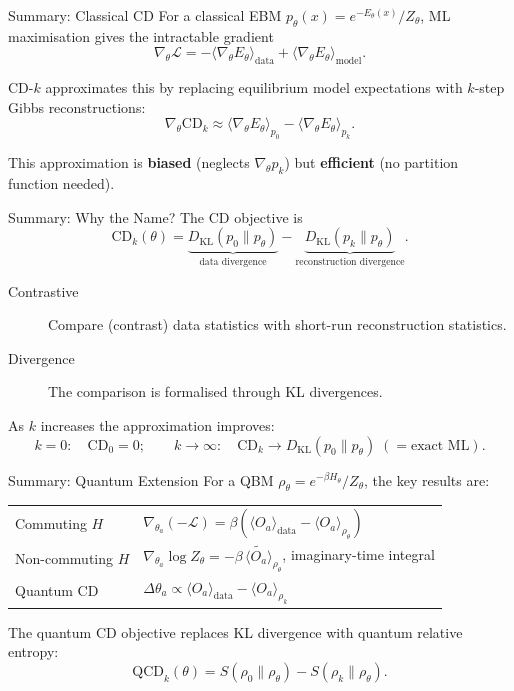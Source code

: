 \documentclass[aspectratio=169]{beamer}
\newcommand{\pmodel}{p_{\theta}}
\newcommand{\DKL}{D_{\mathrm{KL}}}
\newcommand{\Zth}{Z_\theta}
\begin{document}
\begin{frame}{Summary: Classical CD}
For a classical EBM $\pmodel(x) = e^{-E_\theta(x)}/\Zth$,
ML maximisation gives the intractable gradient
\[
  \nabla_\theta\mathcal{L}
  = -\langle\nabla_\theta E_\theta\rangle_{\mathrm{data}}
    + \langle\nabla_\theta E_\theta\rangle_{\mathrm{model}}.
\]

CD-$k$ approximates this by replacing equilibrium model expectations
with $k$-step Gibbs reconstructions:
\[
  \nabla_\theta\mathrm{CD}_k
  \approx
  \langle\nabla_\theta E_\theta\rangle_{p_0}
  -
  \langle\nabla_\theta E_\theta\rangle_{p_k}.
\]

This approximation is \textbf{biased} (neglects $\nabla_\theta p_k$) but
\textbf{efficient} (no partition function needed).
\end{frame}

\begin{frame}{Summary: Why the Name?}
The CD objective is
\[
  \mathrm{CD}_k(\theta)
  =
  \underbrace{\DKL(p_0\|\pmodel)}_{\text{data divergence}}
  -
  \underbrace{\DKL(p_k\|\pmodel)}_{\text{reconstruction divergence}}.
\]

\begin{description}
  \item[Contrastive] Compare (contrast) data statistics with short-run
        reconstruction statistics.
  \item[Divergence] The comparison is formalised through KL divergences.
\end{description}

As $k$ increases the approximation improves:
\[
  k=0: \quad \mathrm{CD}_0 = 0;
  \qquad
  k\to\infty: \quad \mathrm{CD}_k \to \DKL(p_0\|\pmodel) \;(= \text{exact ML}).
\]
\end{frame}

\begin{frame}{Summary: Quantum Extension}
For a QBM $\rho_\theta = e^{-\beta H_\theta}/\Zth$, the key results are:

\medskip
\begin{tabular}{ll}
  Commuting $H$ & $\nabla_{\theta_a}(-\mathcal{L})
                  = \beta(\langle O_a\rangle_{\mathrm{data}}
                         - \langle O_a\rangle_{\rho_\theta})$ \\[6pt]
  Non-commuting $H$ & $\nabla_{\theta_a}\log\Zth
                       = -\beta\,\widetilde{\langle O_a\rangle}_{\rho_\theta}$,
                       imaginary-time integral \\[6pt]
  Quantum CD & $\Delta\theta_a
               \propto \langle O_a\rangle_{\mathrm{data}}
                       - \langle O_a\rangle_{\rho_k}$
\end{tabular}

\medskip
The quantum CD objective replaces KL divergence with quantum relative entropy:
\[
  \mathrm{QCD}_k(\theta)
  = S(\rho_0\|\rho_\theta) - S(\rho_k\|\rho_\theta).
\]
\end{frame}
\end{document}

